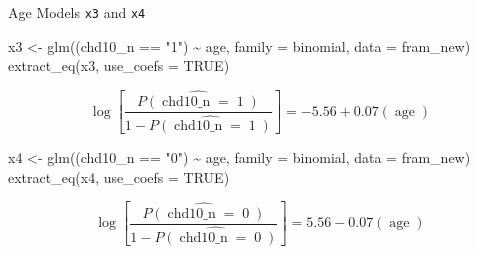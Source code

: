 \documentclass[
  ignorenonframetext,
]{beamer}
\newenvironment{Shaded}{\begin{snugshade}}{\end{snugshade}}
\newcommand{\AttributeTok}[1]{\textcolor[rgb]{0.77,0.63,0.00}{#1}}
\newcommand{\ConstantTok}[1]{\textcolor[rgb]{0.00,0.00,0.00}{#1}}
\newcommand{\FunctionTok}[1]{\textcolor[rgb]{0.00,0.00,0.00}{#1}}
\newcommand{\NormalTok}[1]{#1}
\newcommand{\OtherTok}[1]{\textcolor[rgb]{0.56,0.35,0.01}{#1}}
\newcommand{\SpecialCharTok}[1]{\textcolor[rgb]{0.00,0.00,0.00}{#1}}
\newcommand{\StringTok}[1]{\textcolor[rgb]{0.31,0.60,0.02}{#1}}
\begin{document}
\begin{frame}[fragile]{Age Models \texttt{x3} and \texttt{x4}}
\protect\hypertarget{age-models-x3-and-x4}{}
\begin{Shaded}
\begin{Highlighting}[]
\NormalTok{x3 }\OtherTok{\textless{}{-}} \FunctionTok{glm}\NormalTok{((chd10\_n }\SpecialCharTok{==} \StringTok{"1"}\NormalTok{) }\SpecialCharTok{\textasciitilde{}}\NormalTok{ age, }
          \AttributeTok{family =}\NormalTok{ binomial, }\AttributeTok{data =}\NormalTok{ fram\_new)}
\FunctionTok{extract\_eq}\NormalTok{(x3, }\AttributeTok{use\_coefs =} \ConstantTok{TRUE}\NormalTok{)}
\end{Highlighting}
\end{Shaded}

\begin{equation}
\log\left[ \frac { \widehat{P( \operatorname{chd10\_n} = \operatorname{1} )} }{ 1 - \widehat{P( \operatorname{chd10\_n} = \operatorname{1} )} } \right] = -5.56 + 0.07(\operatorname{age})
\end{equation}

\begin{Shaded}
\begin{Highlighting}[]
\NormalTok{x4 }\OtherTok{\textless{}{-}} \FunctionTok{glm}\NormalTok{((chd10\_n }\SpecialCharTok{==} \StringTok{"0"}\NormalTok{) }\SpecialCharTok{\textasciitilde{}}\NormalTok{ age, }
          \AttributeTok{family =}\NormalTok{ binomial, }\AttributeTok{data =}\NormalTok{ fram\_new)}
\FunctionTok{extract\_eq}\NormalTok{(x4, }\AttributeTok{use\_coefs =} \ConstantTok{TRUE}\NormalTok{)}
\end{Highlighting}
\end{Shaded}

\begin{equation}
\log\left[ \frac { \widehat{P( \operatorname{chd10\_n} = \operatorname{0} )} }{ 1 - \widehat{P( \operatorname{chd10\_n} = \operatorname{0} )} } \right] = 5.56 - 0.07(\operatorname{age})
\end{equation}
\end{frame}
\end{document}
